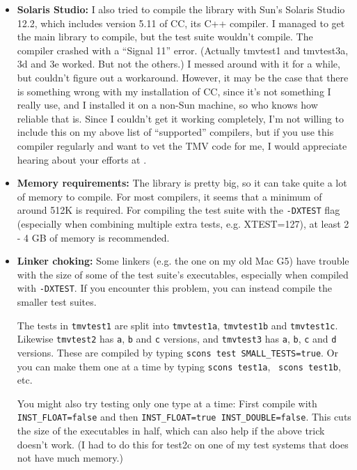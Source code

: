 \begin{itemize}
\item {\bf Solaris Studio:}
I also tried to compile the library with Sun's Solaris Studio 12.2, which includes
version 5.11 of CC, its C++ compiler.
I managed to get the main library to compile, but the test suite wouldn't compile.
The compiler crashed with a ``Signal 11'' error.  
(Actually tmvtest1 and tmvtest3a, 3d and 3e worked.  But not the others.)
I messed around with it for a 
while, but couldn't figure out a workaround.  However, it may be the case that 
there is something wrong with my installation of CC, since it's not something
I really use, and I installed it on a non-Sun machine, so who knows how reliable 
that is.  Since I couldn't get it working completely,
I'm not willing to include this on my above list of ``supported'' compilers,
but if you use this compiler regularly and want to vet the TMV code for me, I would 
appreciate hearing about your efforts at  \mygroup.

\item {\bf Memory requirements:}
The library is pretty big, so it can take quite a lot of memory to compile. 
For most compilers, it seems that a minimum of around 512K is required.
For compiling the test suite with the \texttt{-DXTEST} flag (especially when combining
multiple extra tests, e.g. XTEST=127), at least 2 - 4 GB of memory is recommended.

\item {\bf Linker choking:}
Some linkers (e.g. the one on my old Mac G5) have trouble with the size 
of some of the test suite's executables, especially when compiled 
with \texttt{-DXTEST}.  If you encounter this problem, you can instead
compile the smaller test suites.  

The tests
in \texttt{tmvtest1} are split into \texttt{tmvtest1a}, \texttt{tmvtest1b} and \texttt{tmvtest1c}.
Likewise \texttt{tmvtest2} has \texttt{a}, \texttt{b} and \texttt{c} versions, and \texttt{tmvtest3}
has \texttt{a}, \texttt{b}, \texttt{c} and \texttt{d} versions.  These are 
compiled by typing \texttt{scons test SMALL\_TESTS=true}.  Or you can make them one
at a time by typing \texttt{scons test1a},~ \texttt{scons test1b}, etc.

You might also try testing only one type at a time: First compile with \texttt{INST\_FLOAT=false}
and then \texttt{INST\_FLOAT=true INST\_DOUBLE=false}.  This cuts the size of the executables
in half, which can also help if the above trick doesn't work.  (I had to do this for test2c on one 
of my test systems that does not have much memory.)


\end{itemize}
